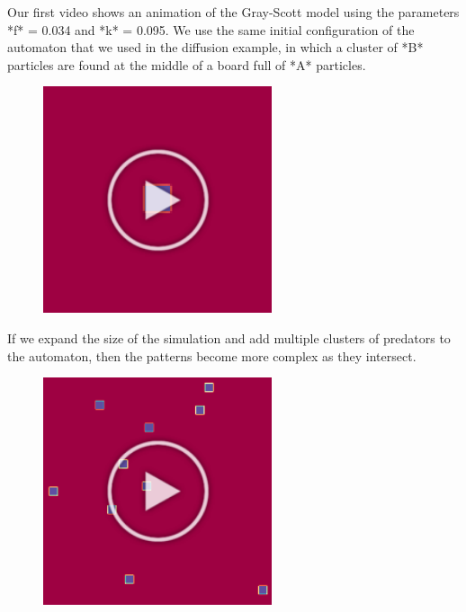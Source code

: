 {{Our first video shows an animation of the Gray-Scott model using the parameters *f* = 0.034 and *k* = 0.095. We use the same initial configuration of the automaton that we used in the diffusion example, in which a cluster of *B* particles are found at the middle of a board full of *A* particles.

\begin{figure}[h]
\centering
\mySfFamily
\includegraphics[width = 0.6\textwidth]{../assets/images/600px/gray-scott_movie_first_frame.png}
\caption{}
\label{fig:gray-scott_movie_first_frame}
\end{figure}

If we expand the size of the simulation and add multiple clusters of predators to the automaton, then the patterns become more complex as they intersect.

\begin{figure}[h]
\centering
\mySfFamily
\includegraphics[width = 0.6\textwidth]{../assets/images/600px/gray-scott_multiple_predators_first_frame.png}
\caption{}
\label{fig:gray-scott_multiple_predators_first_frame}
\end{figure}

}}
